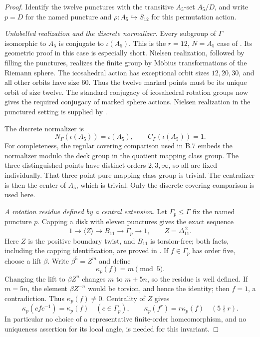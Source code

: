 \begin{proof}
Identify the twelve punctures with the transitive $A_5$-set
$A_5/D$, and write $p=D$ for the named puncture and
$\rho:A_5\hookrightarrow S_{12}$ for this permutation action.

\emph{Unlabelled realization and the discrete normalizer.}
Every subgroup of $\Gamma$ isomorphic to $A_5$ is conjugate
to $\iota(A_5)$.  This is the $r=12$, $N=A_5$ case of
\cite[Theorem 4]{DE_Stukow2004}.  Its geometric proof in this
case is especially short.  Nielsen realization, followed by
filling the punctures, realizes the finite group by M\"obius
transformations of the Riemann sphere.  The icosahedral action
has exceptional orbit sizes $12,20,30$, and all other orbits
have size $60$.  Thus the twelve marked points must be its
unique orbit of size twelve.  The standard conjugacy of
icosahedral rotation groups now gives the required conjugacy
of marked sphere actions.  Nielsen realization in the
punctured setting is supplied by
\cite[Section IV, Theorem 5]{DE_Kerckhoff1983}.

The discrete normalizer is
\[
 N_\Gamma(\iota(A_5))=\iota(A_5),\qquad
 C_\Gamma(\iota(A_5))=1.
 \tag{B.52.2}
\]
For completeness, the regular covering comparison used in
B.7 embeds the normalizer modulo the deck group in
the quotient mapping class group.
The three distinguished points have distinct orders
$2,3,\infty$, so all are fixed individually.  That
three-point pure mapping class group is trivial.
The centralizer is then the center of $A_5$, which is trivial.
Only the discrete covering comparison is used here.

\emph{A rotation residue defined by a central extension.}
Let $\Gamma_p\leq\Gamma$ fix the named puncture $p$.
Capping a disk with eleven punctures gives the exact sequence
\[
 1\longrightarrow\langle Z\rangle
 \longrightarrow B_{11}\longrightarrow\Gamma_p
 \longrightarrow1,
 \qquad Z=\Delta_{11}^{\,2}.
 \tag{B.52.3}
\]
Here $Z$ is the positive boundary twist, and $B_{11}$ is
torsion-free; both facts, including the capping identification,
are proved in \cite[Section 2.2]{DE_GonzalezMeneses2011}.
If $f\in\Gamma_p$ has order five, choose a lift $\beta$.
Write $\beta^5=Z^m$ and define
\[
 \kappa_p(f)=m\pmod5.
\]
Changing the lift to $\beta Z^n$ changes $m$ to $m+5n$,
so the residue is well defined.  If $m=5n$, the element
$\beta Z^{-n}$ would be torsion, and hence the identity;
then $f=1$, a contradiction.  Thus $\kappa_p(f)\ne0$.
Centrality of $Z$ gives
\[
 \kappa_p(cfc^{-1})=\kappa_p(f)\quad(c\in\Gamma_p),
 \qquad
 \kappa_p(f^r)=r\kappa_p(f)\quad(5\nmid r).
 \tag{B.52.4}
\]
In particular no choice of a representative finite-order
homeomorphism, and no uniqueness assertion for its local
angle, is needed for this invariant.


\end{proof}
